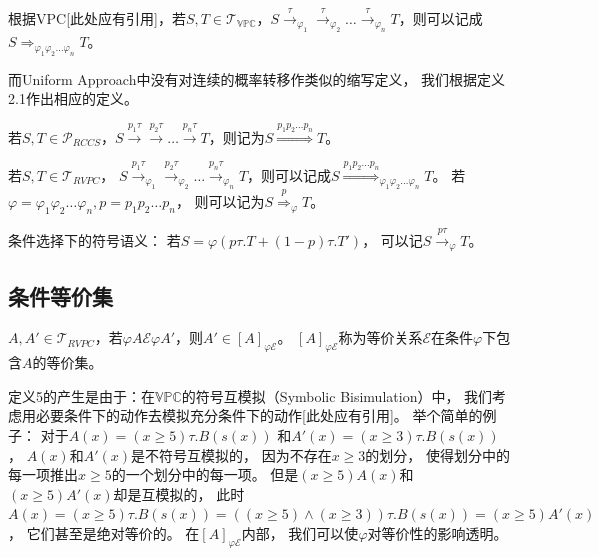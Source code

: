 \begin{definition}\label{def:continous_vpc}
   根据VPC[此处应有引用]，若$S,T\in \mathcal{T}_{\mathbb{VPC}}$，$S\stackrel{\tau}{\rightarrow}_{\varphi_1}\stackrel{\tau}{\rightarrow}_{\varphi_2}\dots \stackrel{\tau}{\rightarrow}_{\varphi_n} T$，则可以记成$S\stackrel{}{\Rightarrow}_{\varphi_1\varphi_2\dots\varphi_n} T$。
\end{definition} 

而Uniform Approach中没有对连续的概率转移作类似的缩写定义，
我们根据定义2.1作出相应的定义。
\begin{definition}
   若$S,T\in \mathcal{P}_{RCCS}$，$S\stackrel{p_1\tau}{\rightarrow}\stackrel{p_2\tau}{\rightarrow}\dots\stackrel{p_n\tau}{\rightarrow}T$，则记为$S\stackrel{p_1p_2\dots p_n}{\Longrightarrow}T$。
\end{definition}

\begin{definition}
   若$S,T\in \mathcal{T}_{RVPC}$，
$S\stackrel{p_1\tau}{\rightarrow}_{\varphi_1}\stackrel{p_2\tau}{\rightarrow}_{\varphi_2}\dots \stackrel{p_n\tau}{\rightarrow}_{\varphi_n} T$，则可以记成$S\stackrel{p_1p_2\dots p_n}{\Longrightarrow}_{\varphi_1\varphi_2\dots\varphi_n} T$。
若$\varphi = \varphi_1\varphi_2\dots \varphi_n, p=p_1p_2\dots p_n$，
则可以记为$S\stackrel{p}{\Rightarrow}_{\varphi} T$。
\end{definition} 

\begin{definition}
   条件选择下的符号语义：
   若$S=\varphi (p\tau.T+(1-p)\tau.T')$，
   可以记$S\stackrel{p\tau}{\rightarrow}_{\varphi} T$。
\end{definition} 
\subsection{条件等价集}
 \begin{definition}
   $A,A'\in \mathcal{T}_{RVPC}$，若$\varphi A \mathcal{E} \varphi A'$，则$A'\in [A]_{\varphi \mathcal{E}}$。
   $[A]_{\varphi \mathcal{E}}$称为等价关系$\mathcal{E}$在条件$\varphi$下包含$A$的等价集。  
 \end{definition} 
 定义5的产生是由于：在$\mathbb{VPC}$的符号互模拟（Symbolic Bisimulation）中，
 我们考虑用必要条件下的动作去模拟充分条件下的动作[此处应有引用]。
 举个简单的例子：
 对于$A(x)=(x\geq 5)\tau.B(s(x))$
 和$A'(x)=(x\geq 3)\tau.B(s(x))$，
 $A(x)$和$A'(x)$是不符号互模拟的，
 因为不存在$x\geq 3$的划分，
 使得划分中的每一项推出$x\geq 5$的一个划分中的每一项。
 但是$(x\geq 5) A(x)$和$(x\geq 5) A'(x)$却是互模拟的，
 此时$A(x)=(x\geq 5)\tau.B(s(x)) = ((x\geq 5)\wedge (x\geq 3))\tau.B(s(x)) = (x\geq 5)A'(x)$，
 它们甚至是绝对等价的。
 在$[A]_{\varphi \mathcal{E}}$内部，
 我们可以使$\varphi$对等价性的影响透明。

